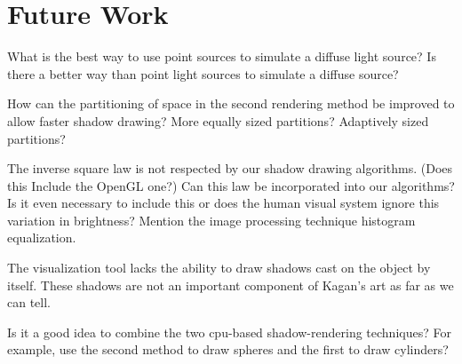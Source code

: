 \documentclass[letter,10pt]{article}
\begin{document}
\section{Future Work}
What is the best way to use point sources to simulate a diffuse light source? Is there a better way than point light sources to simulate a diffuse source?

How can the partitioning of space in the second rendering method be improved to allow faster shadow drawing? More equally sized partitions? Adaptively sized partitions?

The inverse square law is not respected by our shadow drawing algorithms. (Does this Include the OpenGL one?) Can this law be incorporated into our algorithms? Is it even necessary to include this or does the human visual system ignore this variation in brightness? Mention the image processing technique histogram equalization.

The visualization tool lacks the ability to draw shadows cast on the object by itself. These shadows are not an important component of Kagan's art as far as we can tell.

Is it a good idea to combine the two cpu-based shadow-rendering techniques? For example, use the second method to draw spheres and the first to draw cylinders?
\end{document}
